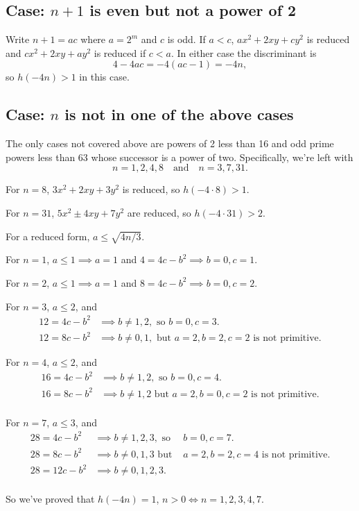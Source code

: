 \subsection{Case: $n+1$ is even but not a power of 2}

Write $n+1 = ac$ where $a = 2^m$ and $c$ is odd. If $a<c$, $ax^2+2xy+cy^2$ is reduced and $cx^2+2xy+ay^2$ is reduced if $c<a$. In either case the discriminant is
\[4-4ac=-4(ac-1)=-4n,\]
so $h(-4n)>1$ in this case.

\subsection{Case: $n$ is not in one of the above cases}

The only cases not covered above are powers of 2 less than 16 and odd prime powers less than 63 whose successor is a power of two. Specifically, we're left with
\[n=1, 2, 4, 8\quad\textrm{and}\quad n=3, 7, 31.\]

For $n=8$, $3x^2+2xy+3y^2$ is reduced, so $h(-4\cdot 8)>1$.

For $n=31$, $5x^2\pm 4xy+7y^2$ are reduced, so $h(-4\cdot 31)>2$.

For a reduced form, $a\leq\sqrt{4n/3}$.

For $n=1$, $a\leq 1\implies a=1$ and $4=4c-b^2\implies b=0, c=1$.

For $n=2$, $a\leq 1\implies a=1$ and $8=4c-b^2\implies b=0, c=2$.

For $n=3$, $a\leq 2$, and
\begin{align*}
12=4c-b^2&\implies b\neq 1,2,\textrm{ so }b=0,c=3.\\
12=8c-b^2&\implies b\neq 0,1,\textrm{ but }a=2, b=2, c=2\textrm{ is not primitive.}
\end{align*}

For $n=4$, $a\leq 2$, and
\begin{align*}
16=4c-b^2&\implies b\neq 1,2,\textrm{ so }b=0,c=4.\\
16=8c-b^2&\implies b\neq 1,2\textrm{ but }a=2, b=0, c=2\textrm{ is not primitive.}\\
\end{align*}

For $n=7$, $a\leq 3$, and
\begin{align*}
28=4c-b^2&\implies b\neq 1,2,3,\textrm{ so }&b=0,c=7.\\
28=8c-b^2&\implies b\neq 0,1,3\textrm{ but }&a=2, b=2, c=4\textrm{ is not primitive.}\\
28=12c-b^2&\implies b\neq 0,1,2,3.\\
\end{align*}

So we've proved that $h(-4n)=1$, $n>0\iff n=1, 2, 3, 4, 7$.
